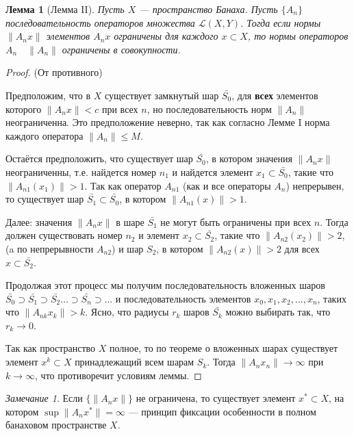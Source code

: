 \documentclass[12pt,a4paper,titlepage,oneside]{book}
\theoremstyle{definition}
\theoremstyle{plain}
\theoremstyle{remark}
\newtheorem*{remark}{Замечание}
\theoremstyle{remark}
\theoremstyle{remark}
\theoremstyle{remark}
\theoremstyle{plain}
\newtheorem*{lemma}{Лемма}
\theoremstyle{plain}
\begin{document}
\begin{lemma}[Лемма II]
Пусть $X$ --- пространство Банаха. Пусть $\lbrace A_n\rbrace$ последовательность операторов множества $\mathcal{L}(X,Y)$. Тогда если нормы $\lVert A_n x\rVert$ элементов $A_n x$ ограничены для каждого $x \subset X$, то нормы операторов $A_n \quad \lVert A_n\rVert$ ограничены в совокупности.
\end{lemma}

\begin{proof}
(От противного)

Предположим, что в $X$ существует замкнутый шар $\bar{S_0}$, для \textbf{всех} элементов которого $\lVert A_n x\rVert < c$ при всех $n$, но последовательность норм $\lVert A_n\rVert$ неограниченна. Это предположение неверно, так как согласно Лемме I норма каждого оператора $\lVert A_n\rVert \leqslant M$.

Остаётся предположить, что существует шар $\bar{S_0}$, в котором значения $\lVert A_n x\rVert$ неограниченны, т.е. найдется номер $n_1$ и найдется элемент $x_1 \subset \bar{S_0}$, такие что $\lVert A_{n1} (x_1)\rVert > 1$. Так как оператор $A_{n1}$ (как и все операторы $A_n$) непрерывен, то существует шар $\bar{S_1} \subset \bar{S_0}$, в котором $\lVert A_{n1} (x)\rVert > 1$.

Далее: значения $\lVert A_n x\rVert$ в шаре $\bar{S_1}$ не могут быть ограничены при всех $n$. Тогда должен существовать номер $n_2$ и элемент $x_2 \subset \bar{S_2}$, такие что $\lVert A_{n2} (x_2)\rVert > 2$, (a по непрерывности $A_{n2}$) и шар $S_2$, в котором $\lVert A_{n2} (x)\rVert > 2$ для всех $x \subset \bar{S_2}$.

Продолжая этот процесс мы получим последовательность вложенных шаров $\bar{S_0} \supset \bar{S_1} \supset \bar{S_2} \ldots \supset \bar{S_n} \supset \ldots$ и последовательность элементов $x_0, x_1, x_2, \ldots, x_n$, таких что $\lVert A_{nk} x_k\rVert > k$. Ясно, что радиусы $r_k$ шаров $\bar{S_k}$ можно выбирать так, что $r_k \to 0$.

Так как пространство $X$ полное, то по теореме о вложенных шарах существует элемент $x^k \subset X$ принадлежащий всем шарам $S_k$. Тогда $\lVert A_n x_n\rVert \to \infty$ при $k \to \infty$, что противоречит условиям леммы.
\end{proof}

\begin{remark}
Если $\lbrace \lVert A_n x\rVert \rbrace$ не ограничена, то существует элемент $x^* \subset X$, на котором $\sup\limits\lVert A_n x^*\rVert = \infty$ --- принцип фиксации особенности в полном банаховом пространстве $X$.
\end{remark}
\end{document}

